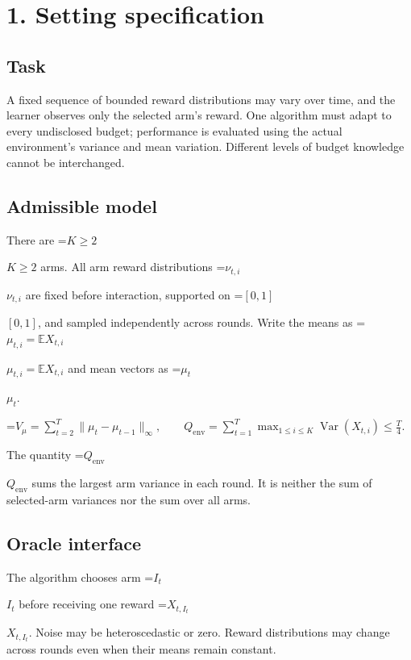\documentclass[10pt,a4paper]{article}
\newcommand{\AtlasMath}[1]{\par\begingroup\centering\setbox0=\hbox{$\displaystyle #1$}\ifdim\wd0>1.4\linewidth\typeout{ATLAS WIDE FORMULA: \the\wd0}\fi\ifdim\wd0>\linewidth\resizebox{\linewidth}{!}{\box0}\else\box0\fi\par\endgroup}
\newcommand{\AtlasInlineMath}[1]{\begingroup\setbox0=\hbox{$#1$}\ifdim\wd0>.4\linewidth\endgroup\AtlasMath{#1}\else\endgroup$#1$\fi}
\begin{document}
\section{1. Setting specification}


\subsection{Task}


A fixed sequence of bounded reward distributions may vary over time, and the learner observes only the selected arm's reward. One algorithm must adapt to every undisclosed budget; performance is evaluated using the actual environment's variance and mean variation. Different levels of budget knowledge cannot be interchanged.



\subsection{Admissible model}


There are \AtlasInlineMath{K\ge2} arms. All arm reward distributions \AtlasInlineMath{\nu_{t,i}} are fixed before interaction, supported on \AtlasInlineMath{[0,1]}, and sampled independently across rounds. Write the means as \AtlasInlineMath{\mu_{t,i}=\mathbb{E} X_{t,i}} and mean vectors as \AtlasInlineMath{\mu_t}.




\AtlasMath{V_\mu=\sum_{t=2}^{T}\|\mu_t-\mu_{t-1}\|_\infty,\qquad Q_{\mathrm{env}}=\sum_{t=1}^{T}\max_{1\le i\le K}\operatorname{Var}(X_{t,i})\le\frac T4.}




The quantity \AtlasInlineMath{Q_{\mathrm{env}}} sums the largest arm variance in each round. It is neither the sum of selected-arm variances nor the sum over all arms.



\subsection{Oracle interface}


The algorithm chooses arm \AtlasInlineMath{I_t} before receiving one reward \AtlasInlineMath{X_{t,I_t}}. Noise may be heteroscedastic or zero. Reward distributions may change across rounds even when their means remain constant.
\end{document}

